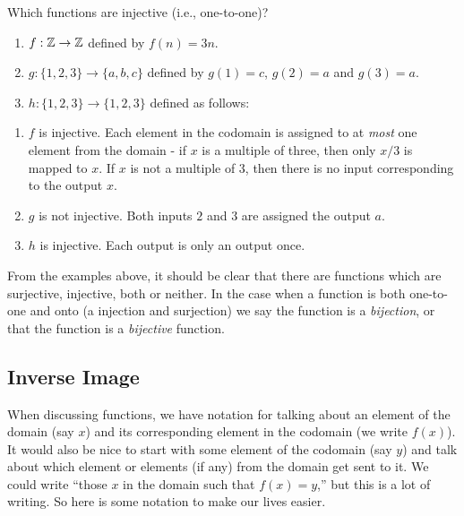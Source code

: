 \documentclass[12pt]{article}
\begin{document}
\begin{example}
  Which functions are injective (i.e., one-to-one)?
    \begin{enumerate}
    \item $f:\mathbb Z \to \mathbb Z$ defined by $f(n) = 3n$.  
    \item $g: \{1,2,3\} \to \{a,b,c\}$ defined by $g(1) = c$, $g(2) = a$ and $g(3) = a$.  
    \item $h:\{1,2,3\} \to \{1,2,3\}$ defined as follows:
    \begin{center}
    \end{center}
  \end{enumerate}
  \begin{solution}
    \begin{enumerate}
      \item $f$ is injective.  Each element in the codomain is assigned to at {\em most} one element from the domain - if $x$ is a multiple of three, then only $x/3$ is mapped to $x$.  If $x$ is not a multiple of 3, then there is no input corresponding to the output $x$.
      \item $g$ is not injective.  Both inputs $2$ and $3$ are assigned the output $a$.
      \item $h$ is injective.  Each output is only an output once.
    \end{enumerate}

  \end{solution}

\end{example}



From the examples above, it should be clear that there are functions which are surjective, injective, both or neither.  In the case when a function is both one-to-one and onto (a injection and surjection) we say the function is a {\em bijection}, or that the function is a {\em bijective} function.  

\subsection{Inverse Image}

When discussing functions, we have notation for talking about an element of the domain (say $x$) and its corresponding element in the codomain (we write $f(x)$).  It would also be nice to start with some element of the codomain (say $y$) and talk about which element or elements (if any) from the domain get sent to it.  We could write ``those $x$ in the domain such that $f(x) = y$,'' but this is a lot of writing.  So here is some notation to make our lives easier.
\end{document}
